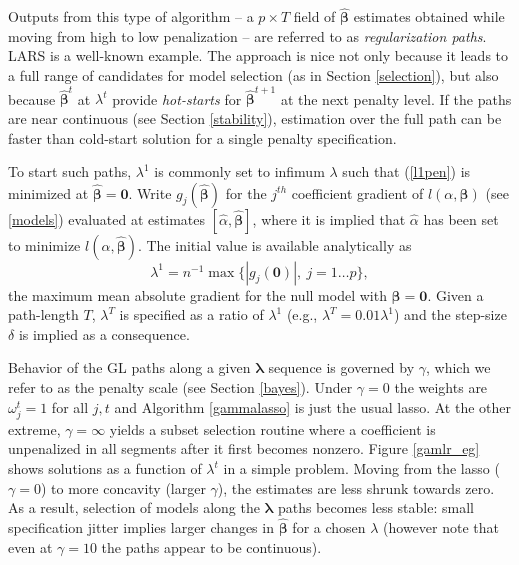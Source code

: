 \documentclass[12pt]{article}
\newcommand{\bs}[1]{\boldsymbol{#1}}
\newcommand{\bm}[1]{\mathbf{#1}}
\begin{document}
Outputs from this type of algorithm -- a $p \times T$
field of $\bs{\hat\beta}$ estimates obtained while moving from high to low
penalization -- are referred to as {\it regularization paths}.  LARS
\citep{efron_least_2004} is a well-known example.  
The approach is nice not only because it leads to a full range of candidates
for model selection (as in Section
\ref{selection}), but also because $\bs{\hat\beta}^t$ at $\lambda^t$
provide {\it hot-starts} for $\bs{\hat\beta}^{t+1}$ at the next penalty level.
If the paths are near continuous (see Section \ref{stability}), estimation
over the full path can be faster than cold-start solution for a single penalty
specification.


To start such paths, $\lambda^1$ is commonly set to infimum $\lambda$ such
that (\ref{l1pen}) is minimized at $\bs{\hat\beta} = \bm{0}$.  Write
$g_j(\bs{\hat\beta})$ for the $j^{th}$ coefficient gradient of
$l(\alpha,\bs{\beta})$ (see \ref{models}) evaluated at
estimates  $[\hat \alpha, \bs{\hat \beta}]$, where it is implied that
$\hat\alpha$ has been set to minimize $l(\alpha,\bs{\hat\beta})$. The initial
value is  available analytically as 
\begin{equation}\label{maxabsgrad}
\lambda^1 = n^{-1}\max\{|g_j(\bm{0})|,~j=1\ldots p\},
\end{equation}
the maximum mean absolute gradient for the
null model with $\bs{\beta} = \bm{0}$. Given a path-length $T$, $\lambda^T$ is
 specified as a ratio of $\lambda^1$ (e.g., $\lambda^T = 0.01\lambda^1$)
and the step-size $\delta$ is implied as a consequence.

Behavior of the GL paths along a given $\bs{\lambda}$ sequence is governed by
$\gamma$, which we refer to as the penalty scale (see Section
\ref{bayes}).  Under $\gamma=0$ the weights are $\omega_j^t = 1$ for all $j,t$
and Algorithm \ref{gammalasso} is just the usual lasso.  At the other extreme,
$\gamma=\infty$ yields a subset selection routine where a coefficient is
unpenalized in all segments after it first becomes nonzero. Figure
\ref{gamlr_eg} shows solutions as a function of $\lambda^t$ in a simple
problem. Moving from the lasso ($\gamma=0$) to more concavity (larger
$\gamma$), the estimates are less shrunk towards zero.  As a result, selection
of models along the $\bs{\lambda}$ paths becomes less stable: small
specification jitter implies larger changes in $\bs{\hat\beta}$ for a chosen
$\lambda$ (however note that even at $\gamma=10$ the paths appear to be
continuous).
\end{document}
